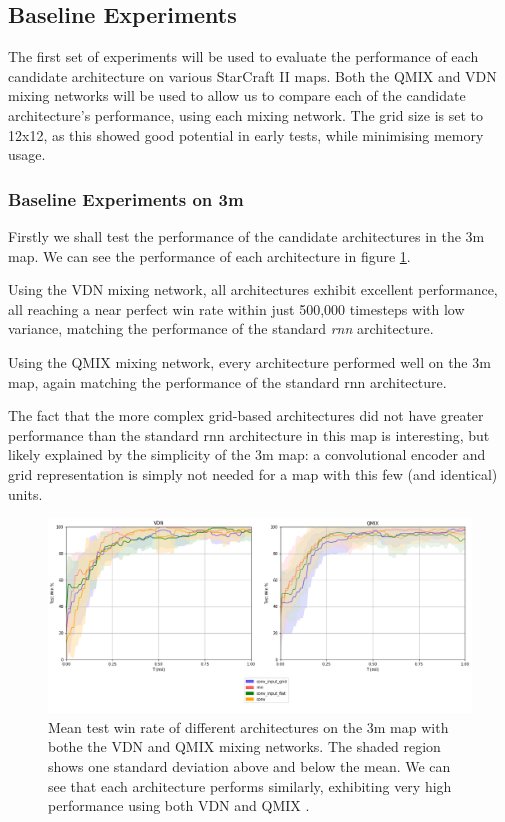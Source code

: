 \subsection{Baseline Experiments}

The first set of experiments will be used to evaluate the performance of each candidate architecture on various StarCraft II maps. Both the QMIX and VDN mixing networks will be used to allow us to compare each of the candidate architecture's performance, using each mixing network. The grid size is set to 12x12, as this showed good potential in early tests, while minimising memory usage.


\subsubsection{Baseline Experiments on 3m}

Firstly we shall test the performance of the candidate architectures in the 3m map. We can see the performance of each architecture in figure \ref{fig:3m_all}. 

Using the VDN mixing network, all architectures exhibit excellent performance, all reaching a near perfect win rate within just 500,000 timesteps with low variance, matching the performance of the standard \textit{rnn} architecture.

Using the QMIX mixing network, every architecture performed well on the 3m map, again matching the performance of the standard rnn architecture. 

The fact that the more complex grid-based architectures did not have greater performance than the standard rnn architecture in this map is interesting, but likely explained by the simplicity of the 3m map: a convolutional encoder and grid representation is simply not needed for a map with this few (and identical) units.

\begin{figure}[h]
    \centering
    \hbox{\hspace{-6.35em}\includegraphics[width=1.34\textwidth]{images/graphs/all3m.png}}
    \caption{Mean test win rate of different architectures on the 3m map with bothe the VDN and QMIX mixing networks. The shaded region shows one standard deviation above and below the mean. We can see that each architecture performs similarly, exhibiting very high performance using both VDN and QMIX .}
    \label{fig:3m_all}
\end{figure}

